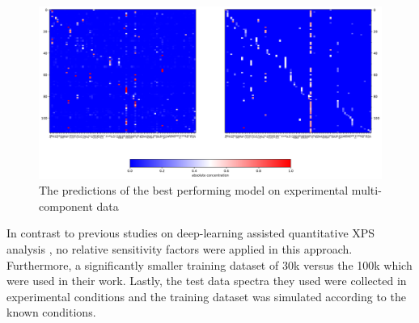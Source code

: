 \begin{figure}
    \centering
    \includegraphics[width=\textwidth]{Figures/cnn_dct_mae_32F_multi_best_model_pred.png}
    \caption{The predictions of the best performing model on experimental multi-component data}
    \label{fig:multi_best_model}
\end{figure}

In contrast to previous studies on deep-learning assisted quantitative XPS analysis \cite{drera_deep_2019}, no relative sensitivity factors were applied in this approach. Furthermore, a significantly smaller training dataset of 30k versus the 100k which were used in their work. Lastly, the test data spectra they used were collected in experimental conditions and the training dataset was simulated according to the known conditions.


